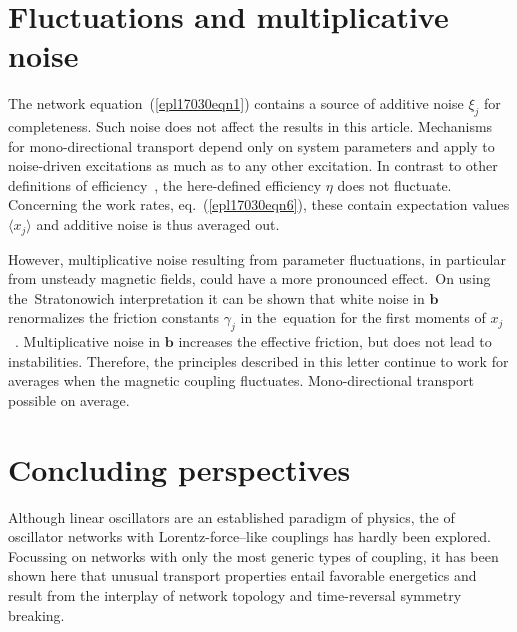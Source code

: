 \documentclass[doublecol,final,edchoice]{epl2}
\begin{document}
\section{Fluctuations and multiplicative noise}

The network equation~(\ref{epl17030eqn1}) contains a source of additive noise $\xi_j$ for completeness. Such noise does not affect the results in this article. Mechanisms for mono-directional transport depend only on system parameters and apply to noise-driven excitations as much as to any other excitation. In contrast to other definitions of efficiency~\cite{epl17030bib21}, the here-defined efficiency $\eta$ does not fluctuate. Concerning the work rates, eq.~(\ref{epl17030eqn6}), these contain expectation values $\langle x_j\rangle$ and additive noise is thus averaged out.

However, multiplicative noise resulting from parameter fluctuations, in particular from unsteady magnetic fields, could have a more pronounced effect.~On using the~Stratonowich interpretation it can be shown that white noise in $\mathbf{b}$ renormalizes the friction constants $\gamma_j$ in the~equation for the first moments of $x_j$~\cite{epl17030bib22}. Multiplicative noise in $\mathbf{b}$ increases the effective friction, but does not lead to instabilities. Therefore, the principles described in this letter continue to work for averages when the magnetic coupling fluctuates. Mono-directional transport  possible on average.

\section{Concluding perspectives}

Although linear oscillators are an established paradigm of physics, the  of oscillator networks with Lorentz-force--like couplings has hardly been explored. Focussing on networks with only the most generic types of coupling, it has been shown here that unusual transport properties entail favorable energetics and result from the interplay of network topology and time-reversal symmetry breaking.
\end{document}
